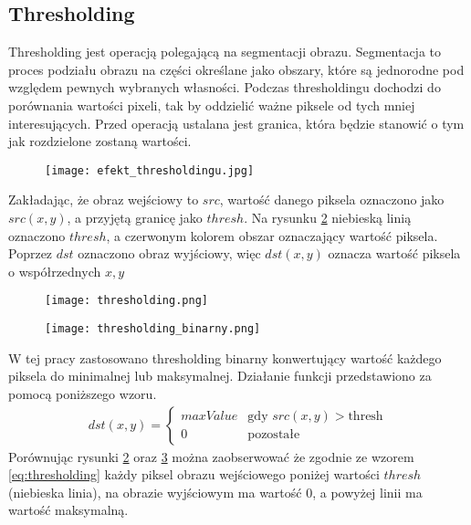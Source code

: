 \subsection{Thresholding}
Thresholding jest operacją polegającą na segmentacji obrazu. Segmentacja to proces podziału obrazu na części określane jako obszary, które są jednorodne pod względem pewnych wybranych własności. Podczas thresholdingu dochodzi do porównania wartości pixeli, tak by oddzielić ważne piksele od tych mniej interesujących. Przed operacją ustalana jest granica, która będzie stanowić o tym jak rozdzielone zostaną wartości.
\begin{figure}[H]
	\centering
	\texttt{[image: efekt\_thresholdingu.jpg]}
	\label{fig:efekt_thresholdingu}
\end{figure}
Zakładając, że obraz wejściowy to $src$, wartość danego piksela oznaczono jako $src(x,y) $, a przyjętą granicę jako $thresh$. Na rysunku \ref{fig:thresholding} niebieską linią oznaczono $thresh$, a czerwonym kolorem obszar oznaczający wartość piksela. Poprzez $dst$ oznaczono obraz wyjściowy, więc $dst(x,y)$ oznacza wartość piksela o współrzednych $x,y$
\begin{figure}[H]
	\centering
	\texttt{[image: thresholding.png]}
	\label{fig:thresholding}
\end{figure}
\begin{figure}[H]
	\centering
	\texttt{[image: thresholding\_binarny.png]}
	\label{fig:thresholding_binarny}
\end{figure}
W tej pracy zastosowano thresholding binarny konwertujący wartość każdego piksela do minimalnej lub maksymalnej. Działanie funkcji przedstawiono za pomocą poniższego wzoru.
 \begin{equation}
 \label{eq:thresholding}
 \begin{aligned}
dst(x,y) = \left\{ \begin{array}{ll}
maxValue & \textrm{gdy $src(x,y)>$thresh}\\
0 & \textrm{pozostałe}
\end{array} \right.
 \end{aligned}
\end{equation}
Porównując rysunki \ref{fig:thresholding} oraz \ref{fig:thresholding_binarny} można zaobserwować że zgodnie ze wzorem \ref{eq:thresholding} każdy piksel obrazu wejściowego poniżej wartości $thresh$ (niebieska linia), na obrazie wyjściowym ma wartość 0, a powyżej linii ma wartość maksymalną.

